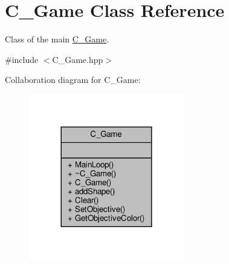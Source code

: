 \hypertarget{classC__Game}{}\section{C\+\_\+\+Game Class Reference}
\label{classC__Game}


Class of the main \hyperlink{classC__Game}{C\+\_\+\+Game}.  




{\ttfamily \#include $<$C\+\_\+\+Game.\+hpp$>$}



Collaboration diagram for C\+\_\+\+Game\+:
\nopagebreak
\begin{figure}[H]
\begin{center}
\leavevmode
\includegraphics[width=192pt]{classC__Game__coll__graph}
\end{center}
\end{figure}
